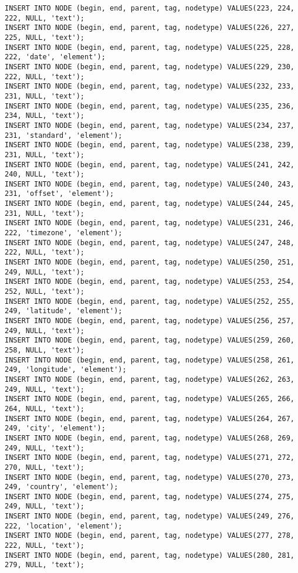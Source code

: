 \begin{verbatim}
INSERT INTO NODE (begin, end, parent, tag, nodetype) VALUES(223, 224, 222, NULL, 'text');
INSERT INTO NODE (begin, end, parent, tag, nodetype) VALUES(226, 227, 225, NULL, 'text');
INSERT INTO NODE (begin, end, parent, tag, nodetype) VALUES(225, 228, 222, 'date', 'element');
INSERT INTO NODE (begin, end, parent, tag, nodetype) VALUES(229, 230, 222, NULL, 'text');
INSERT INTO NODE (begin, end, parent, tag, nodetype) VALUES(232, 233, 231, NULL, 'text');
INSERT INTO NODE (begin, end, parent, tag, nodetype) VALUES(235, 236, 234, NULL, 'text');
INSERT INTO NODE (begin, end, parent, tag, nodetype) VALUES(234, 237, 231, 'standard', 'element');
INSERT INTO NODE (begin, end, parent, tag, nodetype) VALUES(238, 239, 231, NULL, 'text');
INSERT INTO NODE (begin, end, parent, tag, nodetype) VALUES(241, 242, 240, NULL, 'text');
INSERT INTO NODE (begin, end, parent, tag, nodetype) VALUES(240, 243, 231, 'offset', 'element');
INSERT INTO NODE (begin, end, parent, tag, nodetype) VALUES(244, 245, 231, NULL, 'text');
INSERT INTO NODE (begin, end, parent, tag, nodetype) VALUES(231, 246, 222, 'timezone', 'element');
INSERT INTO NODE (begin, end, parent, tag, nodetype) VALUES(247, 248, 222, NULL, 'text');
INSERT INTO NODE (begin, end, parent, tag, nodetype) VALUES(250, 251, 249, NULL, 'text');
INSERT INTO NODE (begin, end, parent, tag, nodetype) VALUES(253, 254, 252, NULL, 'text');
INSERT INTO NODE (begin, end, parent, tag, nodetype) VALUES(252, 255, 249, 'latitude', 'element');
INSERT INTO NODE (begin, end, parent, tag, nodetype) VALUES(256, 257, 249, NULL, 'text');
INSERT INTO NODE (begin, end, parent, tag, nodetype) VALUES(259, 260, 258, NULL, 'text');
INSERT INTO NODE (begin, end, parent, tag, nodetype) VALUES(258, 261, 249, 'longitude', 'element');
INSERT INTO NODE (begin, end, parent, tag, nodetype) VALUES(262, 263, 249, NULL, 'text');
INSERT INTO NODE (begin, end, parent, tag, nodetype) VALUES(265, 266, 264, NULL, 'text');
INSERT INTO NODE (begin, end, parent, tag, nodetype) VALUES(264, 267, 249, 'city', 'element');
INSERT INTO NODE (begin, end, parent, tag, nodetype) VALUES(268, 269, 249, NULL, 'text');
INSERT INTO NODE (begin, end, parent, tag, nodetype) VALUES(271, 272, 270, NULL, 'text');
INSERT INTO NODE (begin, end, parent, tag, nodetype) VALUES(270, 273, 249, 'country', 'element');
INSERT INTO NODE (begin, end, parent, tag, nodetype) VALUES(274, 275, 249, NULL, 'text');
INSERT INTO NODE (begin, end, parent, tag, nodetype) VALUES(249, 276, 222, 'location', 'element');
INSERT INTO NODE (begin, end, parent, tag, nodetype) VALUES(277, 278, 222, NULL, 'text');
INSERT INTO NODE (begin, end, parent, tag, nodetype) VALUES(280, 281, 279, NULL, 'text');

\end{verbatim}
